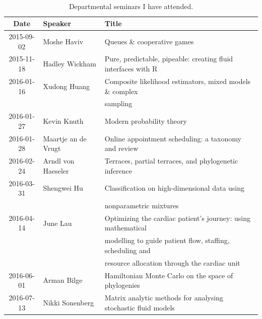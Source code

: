 \documentclass[12pt,a4paper]{article}
\begin{document}
\begin{table}[hh]
\caption{
Departmental seminars I have attended.%
}
\centering
\ ~~~~ \\
\label{tab:seminars}
\begin{tabular}{cll}
\toprule
Date & Speaker & Title \\
\midrule
2015-09-02 & Moshe Haviv &
Queues \& cooperative games \\
%
2015-11-18 & Hadley Wickham &
Pure, predictable, pipeable: creating fluid interfaces with R \\
%
2016-01-16 & Xudong Huang &
Composite likelihood estimators, mixed models \& complex \\
&&sampling \\
%
2016-01-27 & Kevin Knuth &
Modern probability theory \\
%
2016-01-28 & Maartje an de Vrugt &
Online appointment scheduling: a taxonomy and review \\
%
2016-02-24 & Arndl von Haeseler &
Terraces, partial terraces, and phylogenetic inference \\
%
2016-03-31 & Shengwei Hu &
Classification on high-dimensional data using\\&&nonparametric mixtures \\
%
2016-04-14 & June Lau &
Optimizing the cardiac patient's journey: using mathematical \\
&&modelling to guide patient flow, staffing, scheduling and \\
&&resource allocation through the cardiac unit \\
%
2016-06-01 & Arman Bilge &
Hamiltonian Monte Carlo on the space of phylogenies \\
%
2016-07-13 & Nikki Sonenberg &
Matrix analytic methods for analysing stochastic fluid models \\
%
%
\bottomrule
\end{tabular}
\end{table}




\end{document}
